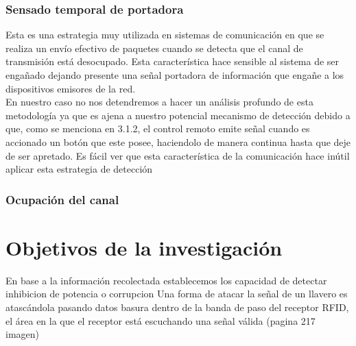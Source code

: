 \documentclass[12pt]{report}
\begin{document}
\subsubsection{Sensado temporal de portadora}

Esta es una estrategia muy utilizada en sistemas de comunicación en que se realiza un envío efectivo de paquetes cuando se detecta que el canal 
de transmisión está desocupado. Esta característica hace sensible al sistema de ser engañado dejando presente una señal portadora de información
que engañe a los dispositivos emisores de la red.\\
En nuestro caso no nos detendremos a hacer un análisis profundo de esta metodología ya que es ajena a nuestro potencial mecanismo de detección
debido a que, como se menciona en 3.1.2, el control remoto emite señal cuando es accionado un botón que este posee, haciendolo de manera continua
hasta que deje de ser apretado. Es fácil ver que esta característica de la comunicación hace inútil aplicar esta estrategia de detección

\subsubsection{Ocupación del canal}




\section{Objetivos de la investigación}
En base a la información recolectada establecemos los
capacidad de detectar inhibicion de potencia o corrupcion
Una forma de atacar la señal de un llavero es atascándola pasando datos basura dentro de la banda de paso del receptor RFID, 
el área en la que el receptor está escuchando una señal válida (pagina 217 imagen)




\pagebreak
\end{document}
